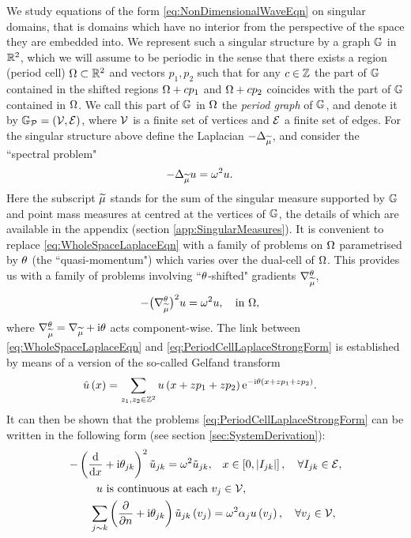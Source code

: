 We study equations of the form \eqref{eq:NonDimensionalWaveEqn} on singular domains, that is domains which have no interior from the perspective of the space they are embedded into.
We represent such a singular structure by a graph $\mathbb{G}$ in $\mathbb{R}^2$, which we will assume to be periodic in the sense that there exists a region (period cell) $\Omega\subset\mathbb{R}^2$ and vectors $p_1, p_2$ such that for any $c\in\mathbb{Z}$ the part of $\mathbb{G}$ contained in the shifted regions $\Omega+c p_1$ and $\Omega+c p_2$ coincides with the part of $\mathbb{G}$ contained in $\Omega$.
We call this part of $\mathbb{G}$ in $\Omega$ the \emph{period graph} of $\mathbb{G}$, and denote it by $\mathbb{G}_{\mathcal{P}}=\left( \mathcal{V}, \mathcal{E} \right)$, where $\mathcal{V}$ is a finite set of vertices and $\mathcal{E}$ a finite set of edges.
For the singular structure above define the Laplacian $-\Delta_{\widetilde{\mu}}$, and consider the ``spectral problem"
\begin{align} \label{eq:WholeSpaceLaplaceEqn}
	-\Delta_{\widetilde{\mu}} u &= \omega^2 u.
\end{align}
Here the subscript $\widetilde{\mu}$ stands for the sum of the singular measure supported by $\mathbb{G}$ and point mass measures at centred at the vertices of $\mathbb{G}$, the details of which are available in the appendix (section \ref{app:SingularMeasures}).
It is convenient to replace \eqref{eq:WholeSpaceLaplaceEqn} with a family of problems on $\Omega$ parametrised by $\theta$ (the ``quasi-momentum") which varies over the dual-cell of $\Omega$.
This provides us with a family of problems involving ``$\theta$-shifted" gradients $\nabla^{\theta}_{\widetilde{\mu}}$,
\begin{align} \label{eq:PeriodCellLaplaceStrongForm}
	-\bigl(\nabla^{\theta}_{\widetilde{\mu}}\bigr)^2 u &= \omega^2 u, \quad\text{in } \Omega,
\end{align}
where $\nabla^{\theta}_{\widetilde{\mu}} = \nabla_{\widetilde{\mu}} + \mathrm{i}\theta$ acts component-wise.
The link between \eqref{eq:WholeSpaceLaplaceEqn} and \eqref{eq:PeriodCellLaplaceStrongForm} is established by means of a version of the so-called Gelfand transform \cite{gelfand1950expansion}
\begin{align*}
	\hat{u}\left( x \right) &= \sum_{z_1,z_2\in\mathbb{Z}^2}u\left( x+zp_1+zp_2 \right)\mathrm{e}^{-\mathrm{i}\theta\left( x+zp_1+zp_2 \right)}.
\end{align*}
It can then be shown that the problems \eqref{eq:PeriodCellLaplaceStrongForm} can be written in the following form (see section \ref{sec:SystemDerivation}):
\begin{subequations} \label{eq:QGFullSystem}
	\begin{align}
		-\left( \dfrac{\mathrm{d}}{\mathrm{d}x} + \mathrm{i}\theta_{jk} \right)^2 \tilde{u}_{jk} = \omega^2 \tilde{u}_{jk}, &\quad x\in\left[ 0,\left\lvert I_{jk} \right\rvert \right], \quad \forall I_{jk}\in \mathcal{E}, \label{eq:QGEdgeODEs} \\
		u \text{ is continuous at each } &v_j \in \mathcal{V}, \label{eq:QGVertCty}\\
		\sum_{j\sim k}\left( \dfrac{\partial }{\partial n} + \mathrm{i}\theta_{jk} \right)\tilde{u}_{jk}\left( v_j \right) &= \omega^2\alpha_{j}u\left( v_j \right), \quad \forall v_j \in \mathcal{V}, \label{eq:QGDerivCondition}
	\end{align}
\end{subequations}

